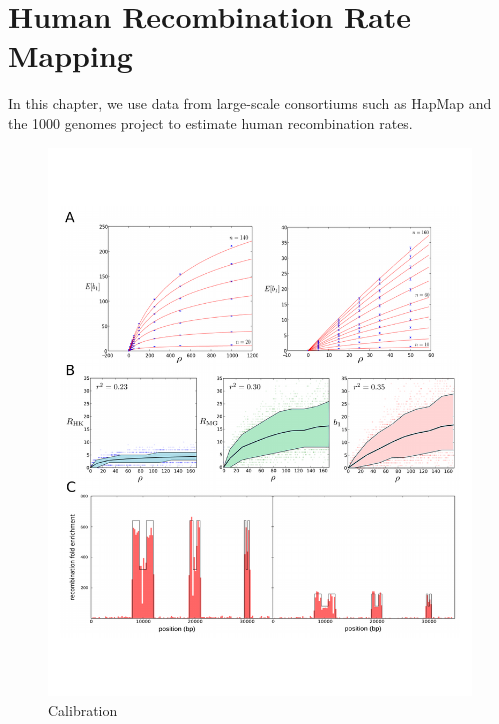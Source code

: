 
\chapter{Human Recombination Rate Mapping}
\label{ch:human_recombination_rate}

In this chapter, we use data from large-scale consortiums such as HapMap and the 1000 genomes project to estimate human recombination rates.

\begin{figure}
\centering
\includegraphics[width=\textwidth]{./fig/human_rates_Fig2.pdf}
\caption{Calibration}
\label{human_rates:fig:fig1}
\end{figure}

